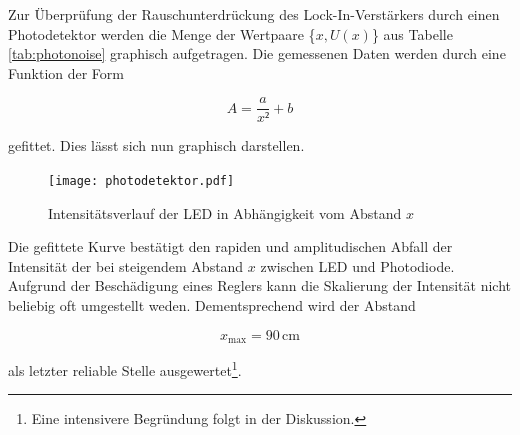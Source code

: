 Zur Überprüfung der Rauschunterdrückung des Lock-In-Verstärkers durch einen Photodetektor werden die Menge der Wertpaare
\{$x,U(x)$\} aus Tabelle \ref{tab:photonoise} graphisch aufgetragen. Die gemessenen Daten werden durch eine Funktion der Form

\begin{equation*}
    A = \frac{a}{x²} + b
\end{equation*}

\noindent gefittet. Dies lässt sich nun graphisch darstellen.

\begin{figure}
    \centering
    \texttt{[image: photodetektor.pdf]}
    \caption{Intensitätsverlauf der LED in Abhängigkeit vom Abstand $x$}
    \label{fig:photoabb}
\end{figure}

\noindent Die gefittete Kurve bestätigt den rapiden und amplitudischen Abfall der Intensität der bei steigendem
Abstand $x$ zwischen LED und Photodiode.\\
Aufgrund der Beschädigung eines Reglers kann die Skalierung der Intensität nicht beliebig oft umgestellt weden. 
Dementsprechend wird der Abstand 

\begin{equation*}
    x_\text{max} = 90\,\unit{\centi\meter}
\end{equation*}

\noindent als letzter reliable Stelle ausgewertet\footnote{Eine intensivere Begründung folgt in der Diskussion.}.
%
